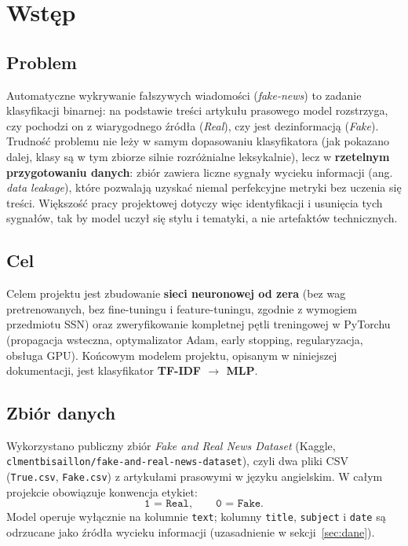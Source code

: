 \section{Wstęp}

\subsection{Problem}

Automatyczne wykrywanie fałszywych wiadomości (\emph{fake-news}) to zadanie
klasyfikacji binarnej: na podstawie treści artykułu prasowego model rozstrzyga,
czy pochodzi on z wiarygodnego źródła (\emph{Real}), czy jest dezinformacją
(\emph{Fake}). Trudność problemu nie leży w samym dopasowaniu klasyfikatora
(jak pokazano dalej, klasy są w tym zbiorze silnie rozróżnialne leksykalnie), lecz w
\textbf{rzetelnym przygotowaniu danych}: zbiór zawiera liczne sygnały wycieku
informacji (ang. \emph{data leakage}), które pozwalają uzyskać niemal perfekcyjne
metryki bez uczenia się treści. Większość pracy projektowej dotyczy więc
identyfikacji i usunięcia tych sygnałów, tak by model uczył się stylu i tematyki, a
nie artefaktów technicznych.

\subsection{Cel}

Celem projektu jest zbudowanie \textbf{sieci neuronowej od zera}
(bez wag pretrenowanych, bez fine-tuningu i feature-tuningu, zgodnie z wymogiem
przedmiotu SSN) oraz zweryfikowanie kompletnej pętli treningowej w PyTorchu
(propagacja wsteczna, optymalizator Adam, early stopping, regularyzacja, obsługa
GPU). Końcowym modelem projektu, opisanym w niniejszej dokumentacji, jest
klasyfikator \textbf{TF-IDF $\rightarrow$ MLP}.

\subsection{Zbiór danych}

Wykorzystano publiczny zbiór \emph{Fake and Real News Dataset} (Kaggle,
\texttt{clmentbisaillon/fake-and-real-news-dataset}), czyli dwa pliki CSV
(\texttt{True.csv}, \texttt{Fake.csv}) z artykułami prasowymi w języku angielskim.
W całym projekcie obowiązuje konwencja etykiet:
\[
  \texttt{1 = Real}, \qquad \texttt{0 = Fake}.
\]
Model operuje wyłącznie na kolumnie \texttt{text}; kolumny \texttt{title},
\texttt{subject} i \texttt{date} są odrzucane jako źródła wycieku informacji
(uzasadnienie w sekcji~\ref{sec:dane}).
